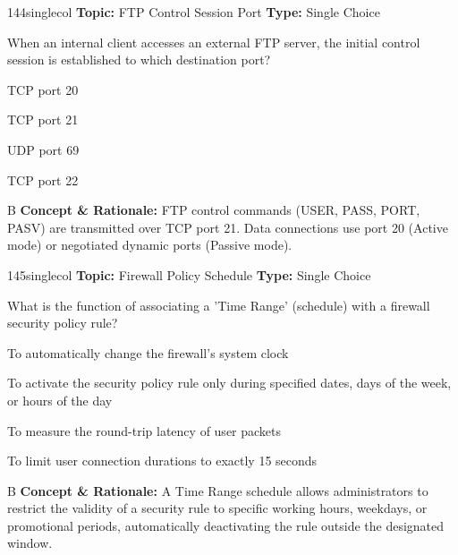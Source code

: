 \begin{qcard}{144}{singlecol}
\textcolor{darkslate!75}{\small\textbf{Topic:} FTP Control Session Port \hfill \textbf{Type:} Single Choice}\vspace{0.4em}\par
When an internal client accesses an external FTP server, the initial control session is established to which destination port?
\begin{qoptions}
\item TCP port 20
\item TCP port 21
\item UDP port 69
\item TCP port 22
\end{qoptions}
\end{qcard}
\nopagebreak
\begin{explainbox}{B}
\textbf{Concept \& Rationale:} FTP control commands (USER, PASS, PORT, PASV) are transmitted over TCP port 21. Data connections use port 20 (Active mode) or negotiated dynamic ports (Passive mode).
\end{explainbox}

\begin{qcard}{145}{singlecol}
\textcolor{darkslate!75}{\small\textbf{Topic:} Firewall Policy Schedule \hfill \textbf{Type:} Single Choice}\vspace{0.4em}\par
What is the function of associating a 'Time Range' (schedule) with a firewall security policy rule?
\begin{qoptions}
\item To automatically change the firewall's system clock
\item To activate the security policy rule only during specified dates, days of the week, or hours of the day
\item To measure the round-trip latency of user packets
\item To limit user connection durations to exactly 15 seconds
\end{qoptions}
\end{qcard}
\nopagebreak
\begin{explainbox}{B}
\textbf{Concept \& Rationale:} A Time Range schedule allows administrators to restrict the validity of a security rule to specific working hours, weekdays, or promotional periods, automatically deactivating the rule outside the designated window.
\end{explainbox}

